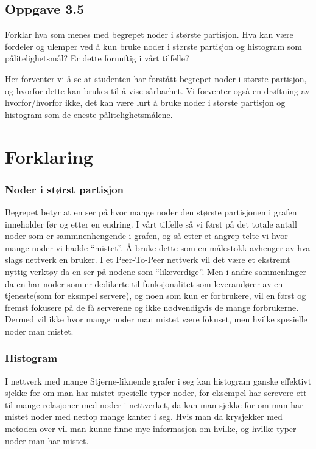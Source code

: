 \documentclass[11pt]{article}
\begin{document}
    \hypertarget{oppgave-3.5}{%
\subsection*{Oppgave 3.5}\label{oppgave-3.5}}

Forklar hva som menes med begrepet noder i største partisjon. Hva kan
være fordeler og ulemper ved å kun bruke noder i største partisjon og
histogram som pålitelighetsmål? Er dette fornuftig i vårt tilfelle?

Her forventer vi å se at studenten har forstått begrepet noder i største
partisjon, og hvorfor dette kan brukes til å vise sårbarhet. Vi
forventer også en drøftning av hvorfor/hvorfor ikke, det kan være lurt å
bruke noder i største partisjon og histogram som de eneste
pålitelighetsmålene.

    \hypertarget{forklaring}{%
\section*{Forklaring}\label{forklaring}}

\hypertarget{noder-i-stuxf8rst-partisjon}{%
\subsubsection*{Noder i størst
partisjon}\label{noder-i-stuxf8rst-partisjon}}

Begrepet betyr at en ser på hvor mange noder den største partisjonen i
grafen inneholder før og etter en endring. I vårt tilfelle så vi først
på det totale antall noder som er sammnenhengende i grafen, og så etter
et angrep telte vi hvor mange noder vi hadde ``mistet''. Å bruke dette
som en målestokk avhenger av hva slags nettverk en bruker. I et
Peer-To-Peer nettverk vil det være et ekstremt nyttig verktøy da en ser
på nodene som ``likeverdige''. Men i andre sammenhnger da en har noder
som er dedikerte til funksjonalitet som leverandører av en tjeneste(som
for eksmpel servere), og noen som kun er forbrukere, vil en først og
fremst fokusere på de få serverene og ikke nødvendigvis de mange
forbrukerne. Dermed vil ikke hvor mange noder man mistet være fokuset,
men hvilke spesielle noder man mistet.

\hypertarget{histogram}{%
\subsubsection*{Histogram}\label{histogram}}

I nettverk med mange Stjerne-liknende grafer i seg kan histogram ganske
effektivt sjekke for om man har mistet spesielle typer noder, for
eksempel har serevere ett til mange relasjoner med noder i nettverket,
da kan man sjekke for om man har mistet noder med nettop mange kanter i
seg. Hvis man da krysjekker med metoden over vil man kunne finne mye
informasjon om hvilke, og hvilke typer noder man har mistet.
\end{document}
